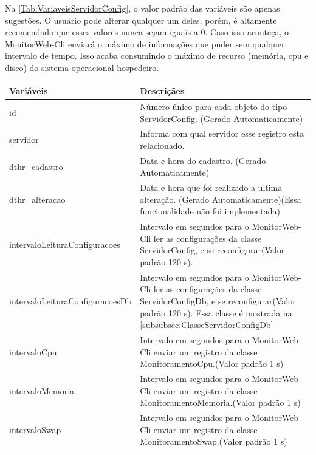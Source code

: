 Na \autoref{Tab:VariaveisServidorConfig}, o valor padrão das variáveis são apenas sugestões. O usuário pode alterar qualquer um deles, porém, é altamente recomendado que esses valores nunca sejam iguais a 0. Caso isso aconteça, o MonitorWeb-Cli enviará o máximo de informações que puder sem qualquer intervalo de tempo. Isso acaba consumindo o máximo de recurso (memória, cpu e disco) do sistema operacional hospedeiro.

\begin{table}[H]
\centering
\begin{tabular}{|l|l|}
\hline
{\color[HTML]{000000} \textbf{Variáveis}} & {\color[HTML]{000000} \textbf{Descriçães}} \\ \hline
id                                     & \multicolumn{1}{p{10.00cm}|}{Número único para cada objeto do tipo ServidorConfig. (Gerado Automaticamente)} \\ \hline
servidor                               & \multicolumn{1}{p{10.00cm}|}{Informa com qual servidor esse registro esta relacionado.}
\\ \hline
dthr\_cadastro                         & \multicolumn{1}{p{10.00cm}|}{Data e hora do cadastro. (Gerado Automaticamente)}\\ \hline
dthr\_alteracao                        & \multicolumn{1}{p{10.00cm}|}{Data e hora que foi realizado a ultima alteração. (Gerado Automaticamente)(Essa funcionalidade não foi implementada)}\\ \hline
intervaloLeituraConfiguracoes          & \multicolumn{1}{p{10.00cm}|}{Intervalo em segundos para o MonitorWeb-Cli ler as configurações da classe ServidorConfig, e se reconfigurar(Valor padrão 120 s).} \\ \hline
intervaloLeituraConfiguracoesDb        & \multicolumn{1}{p{10.00cm}|}{Intervalo em segundos para o  MonitorWeb-Cli ler as configurações da classe ServidorConfigDb, e se reconfigurar(Valor padrão 120 s). Essa classe é mostrada na \autoref{subsubsec:ClasseServidorConfigDb}} \\ \hline
intervaloCpu                           & \multicolumn{1}{p{10.00cm}|}{Intervalo em segundos para o MonitorWeb-Cli enviar um registro da classe MonitoramentoCpu.(Valor padrão 1 s)}\\ \hline
intervaloMemoria                       & \multicolumn{1}{p{10.00cm}|}{Intervalo em segundos para o MonitorWeb-Cli enviar um registro da classe MonitoramentoMemoria.(Valor padrão 1 s)}\\ \hline
intervaloSwap                          & \multicolumn{1}{p{10.00cm}|}{Intervalo em segundos para o MonitorWeb-Cli enviar um registro da classe MonitoramentoSwap.(Valor padrão 1 s)} \\ \hline

\end{tabular}
\end{table}
